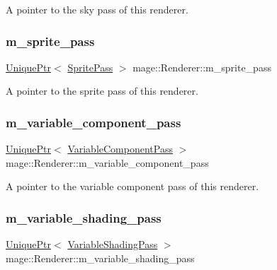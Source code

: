 A pointer to the sky pass of this renderer. \hypertarget{classmage_1_1_renderer_ae6850abe92b8d03f3eefbfb34fe9e5d8}{}\label{classmage_1_1_renderer_ae6850abe92b8d03f3eefbfb34fe9e5d8} 
\subsubsection{\texorpdfstring{m\+\_\+sprite\+\_\+pass}{m\_sprite\_pass}}
{\footnotesize\ttfamily \hyperlink{namespacemage_a3316d7143a973e37adf1110f2e80ca31}{Unique\+Ptr}$<$ \hyperlink{classmage_1_1_sprite_pass}{Sprite\+Pass} $>$ mage\+::\+Renderer\+::m\+\_\+sprite\+\_\+pass\hspace{0.3cm}{\ttfamily [private]}}

A pointer to the sprite pass of this renderer. \hypertarget{classmage_1_1_renderer_a6016e73941650d3b88ef9ab9873548a6}{}\label{classmage_1_1_renderer_a6016e73941650d3b88ef9ab9873548a6} 
\subsubsection{\texorpdfstring{m\+\_\+variable\+\_\+component\+\_\+pass}{m\_variable\_component\_pass}}
{\footnotesize\ttfamily \hyperlink{namespacemage_a3316d7143a973e37adf1110f2e80ca31}{Unique\+Ptr}$<$ \hyperlink{classmage_1_1_variable_component_pass}{Variable\+Component\+Pass} $>$ mage\+::\+Renderer\+::m\+\_\+variable\+\_\+component\+\_\+pass\hspace{0.3cm}{\ttfamily [private]}}

A pointer to the variable component pass of this renderer. \hypertarget{classmage_1_1_renderer_adb0d48e33a86c3ee481b26165e416487}{}\label{classmage_1_1_renderer_adb0d48e33a86c3ee481b26165e416487} 
\subsubsection{\texorpdfstring{m\+\_\+variable\+\_\+shading\+\_\+pass}{m\_variable\_shading\_pass}}
{\footnotesize\ttfamily \hyperlink{namespacemage_a3316d7143a973e37adf1110f2e80ca31}{Unique\+Ptr}$<$ \hyperlink{classmage_1_1_variable_shading_pass}{Variable\+Shading\+Pass} $>$ mage\+::\+Renderer\+::m\+\_\+variable\+\_\+shading\+\_\+pass\hspace{0.3cm}{\ttfamily [private]}}

